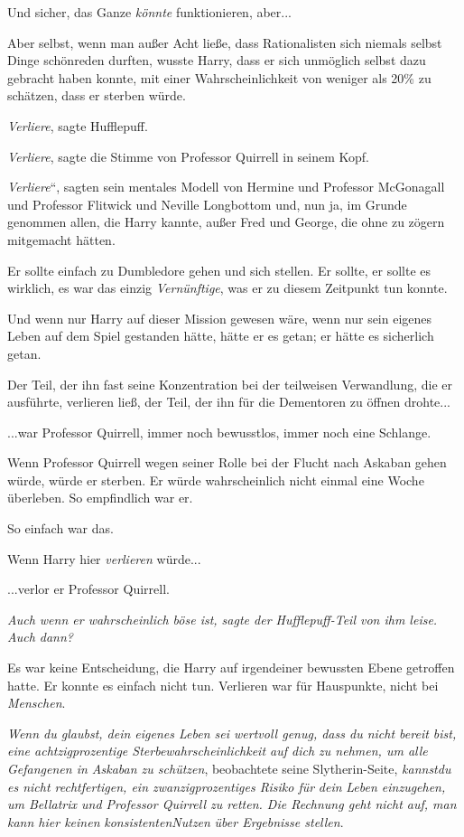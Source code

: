 {Und sicher, das Ganze \emph{könnte} funktionieren, aber...

Aber selbst, wenn man außer Acht ließe, dass Rationalisten sich niemals selbst Dinge schönreden durften, wusste Harry, dass er sich unmöglich selbst dazu gebracht haben konnte, mit einer Wahrscheinlichkeit von weniger als 20\% zu schätzen, dass er sterben würde.

\emph{Verliere}, sagte Hufflepuff.

\emph{Verliere}, sagte die Stimme von Professor Quirrell in seinem Kopf.

\emph{Verliere}“, sagten sein mentales Modell von Hermine und Professor McGonagall und Professor Flitwick und Neville Longbottom und, nun ja, im Grunde genommen allen, die Harry kannte, außer Fred und George, die ohne zu zögern mitgemacht hätten.

Er sollte einfach zu Dumbledore gehen und sich stellen. Er sollte, er sollte es wirklich, es war das einzig \emph{Vernünftige}, was er zu diesem Zeitpunkt tun konnte.

Und wenn nur Harry auf dieser Mission gewesen wäre, wenn nur sein eigenes Leben auf dem Spiel gestanden hätte, hätte er es getan; er hätte es sicherlich getan.

Der Teil, der ihn fast seine Konzentration bei der teilweisen Verwandlung, die er ausführte, verlieren ließ, der Teil, der ihn für die Dementoren zu öffnen drohte...

...war Professor Quirrell, immer noch bewusstlos, immer noch eine Schlange.

Wenn Professor Quirrell wegen seiner Rolle bei der Flucht nach Askaban gehen würde, würde er sterben. Er würde wahrscheinlich nicht einmal eine Woche überleben. So empfindlich war er.

So einfach war das.

Wenn Harry hier \emph{verlieren} würde...

...verlor er Professor Quirrell.

\emph{\emph{Auch wenn er wahrscheinlich böse ist}, sagte der Hufflepuff-Teil von ihm leise. \emph{Auch dann?}}

Es war keine Entscheidung, die Harry auf irgendeiner bewussten Ebene getroffen hatte. Er konnte es einfach nicht tun. Verlieren war für Hauspunkte, nicht bei \emph{Menschen}.

\emph{Wenn du glaubst, dein eigenes Leben sei wertvoll genug, dass du nicht bereit bist, eine achtzigprozentige Sterbewahrscheinlichkeit auf dich zu nehmen, um alle Gefangenen in Askaban zu schützen}, beobachtete seine Slytherin-Seite, \emph{kannstdu} \emph{es nicht rechtfertigen, ein zwanzigprozentiges Risiko für} \emph{dein} \emph{Leben einzugehen, um Bellatrix und Professor Quirrell zu retten. Die Rechnung geht nicht auf, man kann hier keinen} \emph{konsistentenNutzen} \emph{über Ergebnisse stellen}.

}
